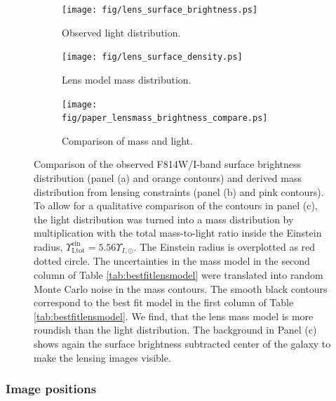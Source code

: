 \documentclass[useAMS,usenatbib]{mnras}
\begin{document}
\begin{figure}
\centering
\begin{subfigure}{.3\textwidth}
  \centering
  \texttt{[image: fig/lens\_surface\_brightness.ps]}
  \caption{Observed light distribution.}
  \label{fig:lenscomparelight}
\end{subfigure}%
\begin{subfigure}{.3\textwidth}
  \centering
  \texttt{[image: fig/lens\_surface\_density.ps]}
  \caption{Lens model mass distribution.}
  \label{fig:lenscomparemass}
\end{subfigure}
\begin{subfigure}{.3\textwidth}
  \centering
  \texttt{[image: fig/paper\_lensmass\_brightness\_compare.ps]}
  \caption{Comparison of mass and light.}
  \label{fig:lenscompareboth}
\end{subfigure}
\caption{Comparison of the observed F814W/I-band surface brightness distribution (panel (a) and orange contours) and derived mass distribution from lensing constraints (panel (b) and pink contours). To allow for a qualitative comparison of the contours in panel (c), the light distribution was turned into a mass distribution by multiplication with the total mass-to-light ratio inside the Einstein radius, $\Upsilon_\text{I,tot}^\text{ein} = 5.56 \Upsilon_{I,\odot}$. The Einstein radius is overplotted as red dotted circle. The uncertainties in the mass model in the second column of Table \ref{tab:bestfitlensmodel} were translated into random Monte Carlo noise in the mass contours. The smooth black contours correspond to the best fit model in the first column of Table \ref{tab:bestfitlensmodel}. We find, that the lens mass model is more roundish than the light distribution. The background in Panel (c) shows again the surface brightness subtracted center of the galaxy to make the lensing images visible.}
\label{fig:lenslightcompareALL}
\end{figure}

\subsubsection{Image positions}
\end{document}

